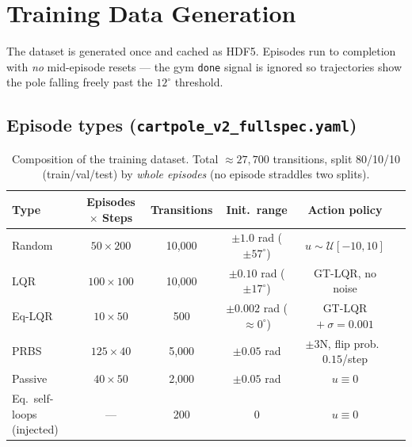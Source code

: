 \documentclass[11pt]{article}
\begin{document}
\section{Training Data Generation}

The dataset is generated once and cached as HDF5. Episodes run to completion
with \emph{no} mid-episode resets --- the gym \texttt{done} signal is ignored
so trajectories show the pole falling freely past the $12^\circ$ threshold.

\subsection{Episode types (\texttt{cartpole\_v2\_fullspec.yaml})}

\begin{table}[h]
\centering
\small
\begin{tabular}{@{}lccccc@{}}
\toprule
Type & Episodes $\times$ Steps & Transitions & Init.\ range & Action policy \\
\midrule
Random   & $50 \times 200$  & 10{,}000 & $\pm 1.0$ rad ($\pm 57^\circ$) & $u \sim \mathcal{U}[-10, 10]$ \\
LQR      & $100 \times 100$ & 10{,}000 & $\pm 0.10$ rad ($\pm 17^\circ$) & GT-LQR, no noise \\
Eq-LQR   & $10 \times 50$   & 500      & $\pm 0.002$ rad ($\approx 0^\circ$) & GT-LQR $+\ \sigma{=}0.001$ \\
PRBS     & $125 \times 40$  & 5{,}000  & $\pm 0.05$ rad & $\pm 3$N, flip prob.\ $0.15$/step \\
Passive  & $40 \times 50$   & 2{,}000  & $\pm 0.05$ rad & $u \equiv 0$ \\
Eq.\ self-loops (injected) & --- & 200 & $0$ & $u \equiv 0$ \\
\bottomrule
\end{tabular}
\caption{Composition of the training dataset. Total $\approx 27{,}700$
transitions, split 80/10/10 (train/val/test) by \emph{whole episodes}
(no episode straddles two splits).}
\end{table}
\end{document}
